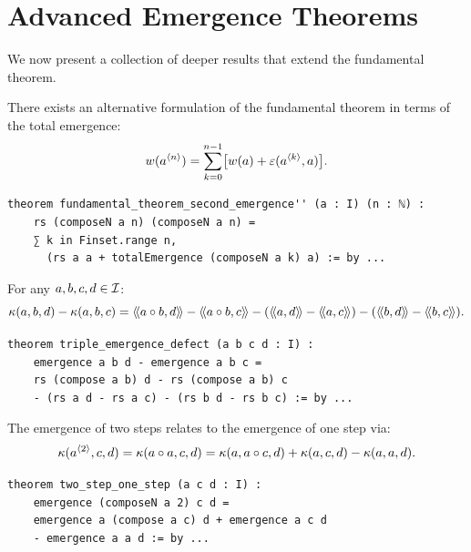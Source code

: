 \section{Advanced Emergence Theorems}

We now present a collection of deeper results that extend the fundamental theorem.

\begin{theorem}
\label{thm:fundamental-second}
There exists an alternative formulation of the fundamental theorem in terms of
the total emergence:
\[
  w(a^{\langle n \rangle}) = \sum_{k=0}^{n-1} \bigl[w(a) + \varepsilon(a^{\langle k \rangle}, a)\bigr].
\]
\end{theorem}

\begin{lstlisting}[caption={Second form (IDT\_v3\_Emergence.lean)}]
theorem fundamental_theorem_second_emergence'' (a : I) (n : ℕ) :
    rs (composeN a n) (composeN a n) =
    ∑ k in Finset.range n,
      (rs a a + totalEmergence (composeN a k) a) := by ...
\end{lstlisting}

\begin{theorem}
\label{thm:triple-emergence-defect}
For any $a, b, c, d \in \mathcal{I}$:
\[
  \emerge(a,b,d) - \emerge(a,b,c) = \rs{a \compose b}{d} - \rs{a \compose b}{c}
  - (\rs{a}{d} - \rs{a}{c}) - (\rs{b}{d} - \rs{b}{c}).
\]
\end{theorem}

\begin{lstlisting}[caption={Triple defect (IDT\_v3\_Emergence.lean)}]
theorem triple_emergence_defect (a b c d : I) :
    emergence a b d - emergence a b c =
    rs (compose a b) d - rs (compose a b) c
    - (rs a d - rs a c) - (rs b d - rs b c) := by ...
\end{lstlisting}

\begin{theorem}
\label{thm:two-step-one-step}
The emergence of two steps relates to the emergence of one step via:
\[
  \kappa(a^{\langle 2 \rangle}, c, d) = \kappa(a \circ a, c, d)
  = \kappa(a, a \circ c, d) + \kappa(a, c, d) - \kappa(a, a, d).
\]
\end{theorem}

\begin{lstlisting}[caption={Two-step one-step (IDT\_v3\_Emergence.lean)}]
theorem two_step_one_step (a c d : I) :
    emergence (composeN a 2) c d =
    emergence a (compose a c) d + emergence a c d
    - emergence a a d := by ...
\end{lstlisting}

